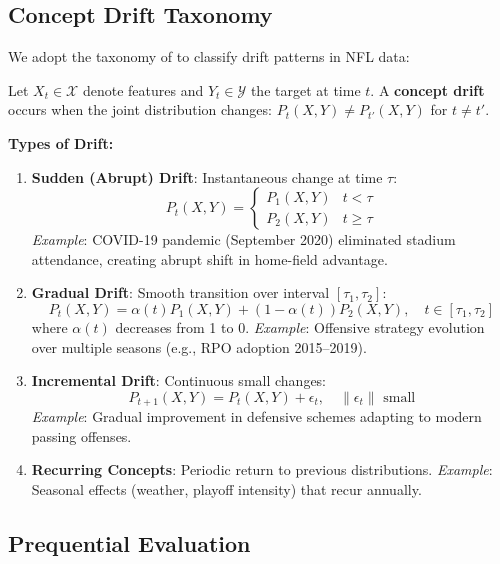 \subsection{Concept Drift Taxonomy}

We adopt the taxonomy of \citet{gama2014survey} to classify drift patterns in NFL data:

\begin{definition}
Let $X_t \in \mathcal{X}$ denote features and $Y_t \in \mathcal{Y}$ the target at time $t$. A \textbf{concept drift} occurs when the joint distribution changes: $P_t(X, Y) \neq P_{t'}(X, Y)$ for $t \neq t'$.
\end{definition}

\noindent \textbf{Types of Drift:}

\begin{enumerate}
    \item \textbf{Sudden (Abrupt) Drift}: Instantaneous change at time $\tau$:
    \[
    P_t(X, Y) = \begin{cases}
        P_1(X, Y) & t < \tau \\
        P_2(X, Y) & t \geq \tau
    \end{cases}
    \]
    \textit{Example}: COVID-19 pandemic (September 2020) eliminated stadium attendance, creating abrupt shift in home-field advantage.

    \item \textbf{Gradual Drift}: Smooth transition over interval $[\tau_1, \tau_2]$:
    \[
    P_t(X, Y) = \alpha(t) P_1(X, Y) + (1 - \alpha(t)) P_2(X, Y), \quad t \in [\tau_1, \tau_2]
    \]
    where $\alpha(t)$ decreases from 1 to 0.
    \textit{Example}: Offensive strategy evolution over multiple seasons (e.g., RPO adoption 2015--2019).

    \item \textbf{Incremental Drift}: Continuous small changes:
    \[
    P_{t+1}(X, Y) = P_t(X, Y) + \epsilon_t, \quad \|\epsilon_t\| \text{ small}
    \]
    \textit{Example}: Gradual improvement in defensive schemes adapting to modern passing offenses.

    \item \textbf{Recurring Concepts}: Periodic return to previous distributions.
    \textit{Example}: Seasonal effects (weather, playoff intensity) that recur annually.
\end{enumerate}

\subsection{Prequential Evaluation}

